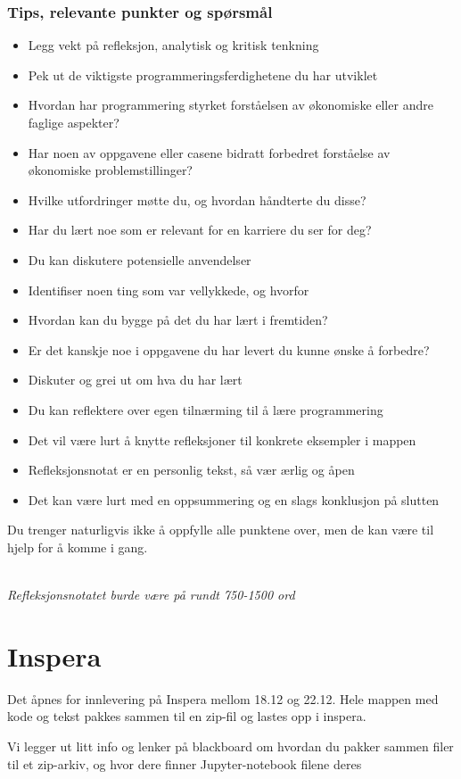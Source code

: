 \documentclass[12pt, titlepage]{article}
\begin{document}
\subsubsection*{Tips, relevante punkter og spørsmål}
\begin{itemize}
   \item{Legg vekt på refleksjon, analytisk og kritisk tenkning}
   \item{Pek ut de viktigste programmeringsferdighetene du har utviklet}
   \item{Hvordan har programmering styrket forståelsen av økonomiske eller andre faglige aspekter?}
   \item{Har noen av oppgavene eller casene bidratt forbedret forståelse av økonomiske problemstillinger?}
   \item{Hvilke utfordringer møtte du, og hvordan håndterte du disse?}
   \item{Har du lært noe som er relevant for en karriere du ser for deg?}
   \item{Du kan diskutere potensielle anvendelser}
   \item{Identifiser noen ting som var vellykkede, og hvorfor}
   \item{Hvordan kan du bygge på det du har lært i fremtiden?}
   \item{Er det kanskje noe i oppgavene du har levert du kunne ønske å forbedre?}
   \item{Diskuter og grei ut om hva du har lært}
   \item{Du kan reflektere over egen tilnærming til å lære programmering}
   \item{Det vil være lurt å knytte refleksjoner til konkrete eksempler i mappen}
   \item{Refleksjonsnotat er en personlig tekst, så vær ærlig og åpen}
   \item{Det kan være lurt med en oppsummering og en slags konklusjon på slutten}
\end{itemize}

Du trenger naturligvis ikke å oppfylle alle punktene over, men de kan være til hjelp for å komme i gang.

~\\
\textit{Refleksjonsnotatet burde være på rundt 750-1500 ord}

\section*{Inspera}

Det åpnes for innlevering på Inspera mellom 18.12 og 22.12.
Hele mappen med kode og tekst pakkes sammen til en zip-fil og lastes opp i inspera.

Vi legger ut litt info og lenker på blackboard om hvordan du pakker sammen filer til et zip-arkiv, og hvor dere finner Jupyter-notebook filene deres
\end{document}
